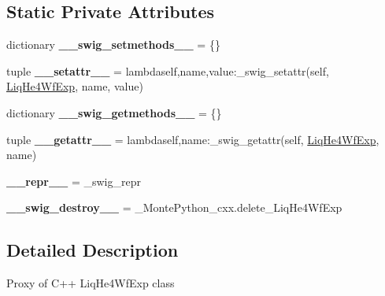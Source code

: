 \subsection*{Static Private Attributes}
\begin{DoxyCompactItemize}
\item 
\hypertarget{classMontePython__cxx_1_1LiqHe4WfExp_aa31f70202b64c481882ae5ac2cc349f7}{}dictionary {\bfseries \+\_\+\+\_\+swig\+\_\+setmethods\+\_\+\+\_\+} = \{\}\label{classMontePython__cxx_1_1LiqHe4WfExp_aa31f70202b64c481882ae5ac2cc349f7}

\item 
\hypertarget{classMontePython__cxx_1_1LiqHe4WfExp_aeac09c4cc7820215c0bed5cfd92277db}{}tuple {\bfseries \+\_\+\+\_\+setattr\+\_\+\+\_\+} = lambdaself,name,value\+:\+\_\+swig\+\_\+setattr(self, \hyperlink{classMontePython__cxx_1_1LiqHe4WfExp}{Liq\+He4\+Wf\+Exp}, name, value)\label{classMontePython__cxx_1_1LiqHe4WfExp_aeac09c4cc7820215c0bed5cfd92277db}

\item 
\hypertarget{classMontePython__cxx_1_1LiqHe4WfExp_a6d6517157ae1c561ae828f4834c235b8}{}dictionary {\bfseries \+\_\+\+\_\+swig\+\_\+getmethods\+\_\+\+\_\+} = \{\}\label{classMontePython__cxx_1_1LiqHe4WfExp_a6d6517157ae1c561ae828f4834c235b8}

\item 
\hypertarget{classMontePython__cxx_1_1LiqHe4WfExp_aca0f34fdb77c38e67fe37b274c144a5b}{}tuple {\bfseries \+\_\+\+\_\+getattr\+\_\+\+\_\+} = lambdaself,name\+:\+\_\+swig\+\_\+getattr(self, \hyperlink{classMontePython__cxx_1_1LiqHe4WfExp}{Liq\+He4\+Wf\+Exp}, name)\label{classMontePython__cxx_1_1LiqHe4WfExp_aca0f34fdb77c38e67fe37b274c144a5b}

\item 
\hypertarget{classMontePython__cxx_1_1LiqHe4WfExp_a0d14be73cca0a08bf1f30cfa787741af}{}{\bfseries \+\_\+\+\_\+repr\+\_\+\+\_\+} = \+\_\+swig\+\_\+repr\label{classMontePython__cxx_1_1LiqHe4WfExp_a0d14be73cca0a08bf1f30cfa787741af}

\item 
\hypertarget{classMontePython__cxx_1_1LiqHe4WfExp_acfe36ca0daa4ae086f1e06ea0fe66d3a}{}{\bfseries \+\_\+\+\_\+swig\+\_\+destroy\+\_\+\+\_\+} = \+\_\+\+Monte\+Python\+\_\+cxx.\+delete\+\_\+\+Liq\+He4\+Wf\+Exp\label{classMontePython__cxx_1_1LiqHe4WfExp_acfe36ca0daa4ae086f1e06ea0fe66d3a}

\end{DoxyCompactItemize}


\subsection{Detailed Description}
\begin{DoxyVerb}Proxy of C++ LiqHe4WfExp class\end{DoxyVerb}
 

